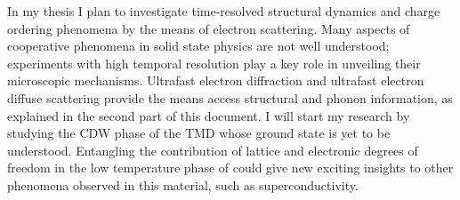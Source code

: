 In my thesis I plan to investigate time-resolved structural dynamics and charge ordering phenomena by the means of electron scattering.
Many aspects of cooperative phenomena in solid state physics are not well understood; experiments with high temporal resolution play a key role in unveiling their microscopic mechanisms.
Ultrafast electron diffraction and ultrafast electron diffuse scattering provide the means access structural and phonon information, as explained in the second part of this document.
I will start my research by studying the \acl{CDW} phase of the \acl{TMD} \ts\space whose ground state is yet to be understood.
Entangling the contribution of lattice and electronic degrees of freedom in the low temperature phase of \ts\space could give new exciting insights to other phenomena observed in this material, such as superconductivity.